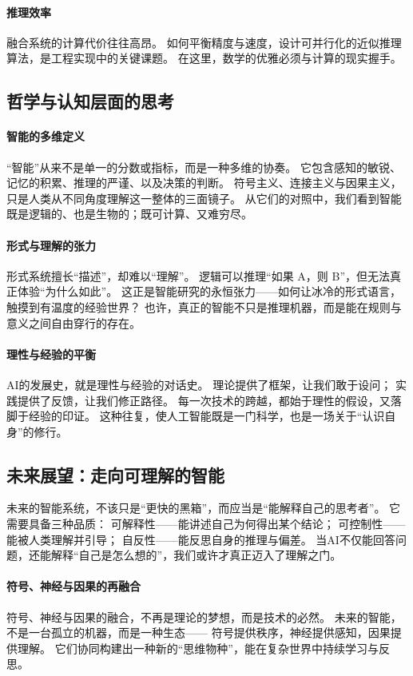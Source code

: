 \paragraph{推理效率}
融合系统的计算代价往往高昂。  
如何平衡精度与速度，设计可并行化的近似推理算法，是工程实现中的关键课题。  
在这里，数学的优雅必须与计算的现实握手。

\subsection{哲学与认知层面的思考}

\paragraph{智能的多维定义}
“智能”从来不是单一的分数或指标，而是一种多维的协奏。  
它包含感知的敏锐、记忆的积累、推理的严谨、以及决策的判断。  
符号主义、连接主义与因果主义，只是人类从不同角度理解这一整体的三面镜子。  
从它们的对照中，我们看到智能既是逻辑的、也是生物的；既可计算、又难穷尽。

\paragraph{形式与理解的张力}
形式系统擅长“描述”，却难以“理解”。  
逻辑可以推理“如果 A，则 B”，但无法真正体验“为什么如此”。  
这正是智能研究的永恒张力——如何让冰冷的形式语言，触摸到有温度的经验世界？  
也许，真正的智能不只是推理机器，而是能在规则与意义之间自由穿行的存在。

\paragraph{理性与经验的平衡}
AI的发展史，就是理性与经验的对话史。  
理论提供了框架，让我们敢于设问；  
实践提供了反馈，让我们修正路径。  
每一次技术的跨越，都始于理性的假设，又落脚于经验的印证。  
这种往复，使人工智能既是一门科学，也是一场关于“认识自身”的修行。

\subsection{未来展望：走向可理解的智能}

未来的智能系统，不该只是“更快的黑箱”，而应当是“能解释自己的思考者”。  
它需要具备三种品质：  
可解释性——能讲述自己为何得出某个结论；  
可控制性——能被人类理解并引导；  
自反性——能反思自身的推理与偏差。  
当AI不仅能回答问题，还能解释“自己是怎么想的”，我们或许才真正迈入了理解之门。

\paragraph{符号、神经与因果的再融合}
符号、神经与因果的融合，不再是理论的梦想，而是技术的必然。  
未来的智能，不是一台孤立的机器，而是一种生态——  
符号提供秩序，神经提供感知，因果提供理解。  
它们协同构建出一种新的“思维物种”，能在复杂世界中持续学习与反思。

